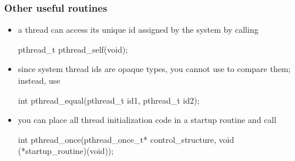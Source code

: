 \begin{frame}[fragile]
%
  \frametitle{Other useful routines}
%
  \begin{itemize}
%
  \item a thread can access its unique id assigned by the system by calling 
%
    \begin{C}
pthread_t pthread_self(void);
    \end{C}
%
  \item since system thread ids are opaque types, you cannot use \operator{==} to compare
    them; instead, use
%
    \begin{C}
int pthread_equal(pthread_t id1, pthread_t id2);
    \end{C}
%
  \item you can place all thread initialization code in a startup routine and call
%
    \begin{C}
int pthread_once(pthread_once_t* control_structure, void (*startup_routine)(void));
    \end{C}
%
  \end{itemize}
%
\end{frame}

